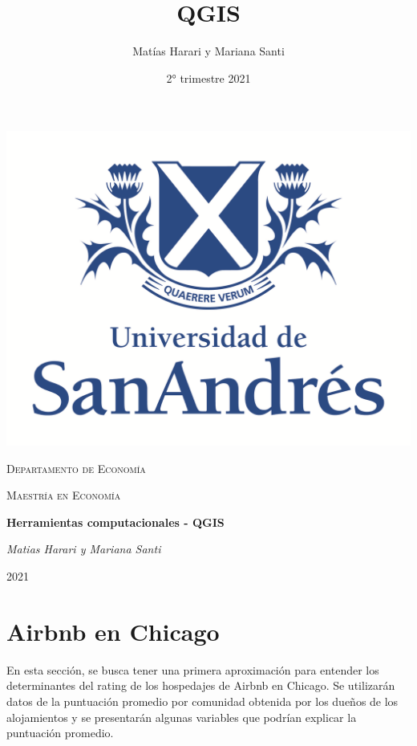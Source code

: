 \documentclass[10.5pt]{article}   %
\title{QGIS}
\author{Matías Harari y Mariana Santi}
\date{2° trimestre 2021}
\begin{document}
\renewcommand{\thesubsection}{\thesection.\alph{subsection}}

\thispagestyle{empty}
\setlength\headheight{0pt} 
\begin{center}

\begin{center}
\includegraphics[width=0.65\linewidth]{imgs/logoudesa.png}            
\end{center}	

        \vspace{0.2cm}
        {\scshape\LARGE Departamento de Economía \par}
        \vspace{0.2cm}
        {\scshape\Large Maestría en Economía\par}
        \vspace{0.4cm}

        {\Large\bfseries Herramientas computacionales - QGIS\par}
        
        \vspace{1cm}
        {\Large\itshape Matias Harari y Mariana Santi \par}


\vspace{1cm} 
\large
{2021}

\end{center}

\clearpage
\justify




\section*{Airbnb en Chicago}
En esta sección, se busca tener una primera aproximación para entender los determinantes del rating de los hospedajes de Airbnb en Chicago. Se utilizarán datos de la puntuación promedio por comunidad obtenida por los dueños de los alojamientos y se presentarán algunas variables que podrían explicar la puntuación promedio.
\end{document}
